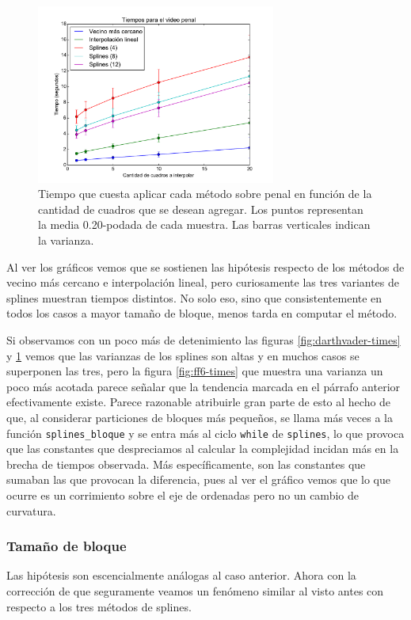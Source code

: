 \begin{figure}[H]
 \centering
	\includegraphics[width=0.7\textwidth]{imgs/resultados_tiempos/penal_times.pdf}
    \caption{\footnotesize Tiempo que cuesta aplicar cada método sobre penal en función de la cantidad de cuadros que se desean agregar. Los puntos representan la media 0.20-podada de cada muestra. Las barras verticales indican la varianza.}
    \label{fig:penal-times}
\end{figure}

Al ver los gráficos vemos que se sostienen las hipótesis respecto de los métodos de vecino más cercano e interpolación lineal, pero curiosamente las tres variantes de splines muestran tiempos distintos. No solo eso, sino que consistentemente en todos los casos a mayor tamaño de bloque, menos tarda en computar el método.

Si observamos con un poco más de detenimiento las figuras \ref{fig:darthvader-times} y \ref{fig:penal-times} vemos que las varianzas de los splines son altas y en muchos casos se superponen las tres, pero la figura \ref{fig:ff6-times} que muestra una varianza un poco más acotada parece señalar que la tendencia marcada en el párrafo anterior efectivamente existe. Parece razonable atribuirle gran parte de esto al hecho de que, al considerar particiones de bloques más pequeños, se llama más veces a la función  \texttt{splines\_bloque} y se entra más al ciclo \texttt{while} de \texttt{splines}, lo que provoca que las constantes que despreciamos al calcular la complejidad incidan más en la brecha de tiempos observada. Más específicamente, son las constantes que sumaban las que provocan la diferencia, pues al ver el gráfico vemos que lo que ocurre es un corrimiento sobre el eje de ordenadas pero no un cambio de curvatura.


\subsubsection{Tamaño de bloque}
Las hipótesis son escencialmente análogas al caso anterior. Ahora con la corrección de que seguramente veamos un fenómeno similar al visto antes con respecto a los tres métodos de splines.

